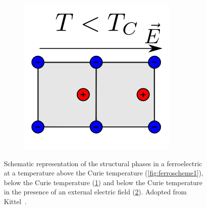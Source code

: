 \begin{figure}
\begin{subfigure}{0.3\textwidth}
	\caption{}
	\label{fig:ferroscheme2}
\end{subfigure}
\begin{subfigure}{0.3\textwidth}
\centering
	\includegraphics[width=0.9\linewidth]{./figs/chap1/ferroscheme3}
	\caption{}
	\label{fig:ferroscheme3}
\end{subfigure}
\caption[Schematic representation of the structural phases in a ferroelectric at a temperature above the Curie temperature (\ref{fig:ferroscheme1}), below the Curie temperature (\ref{fig:ferroscheme2}) and below the Curie temperature in the presence of an external electric field (\ref{fig:ferroscheme3}).]{Schematic representation of the structural phases in a ferroelectric at a temperature above the Curie temperature (\ref{fig:ferroscheme1}), below the Curie temperature (\ref{fig:ferroscheme2}) and below the Curie temperature in the presence of an external electric field (\ref{fig:ferroscheme3}). Adopted from Kittel~\cite[p. 478]{kittel}.}
\label{fig:ferroscheme}
\end{figure}
